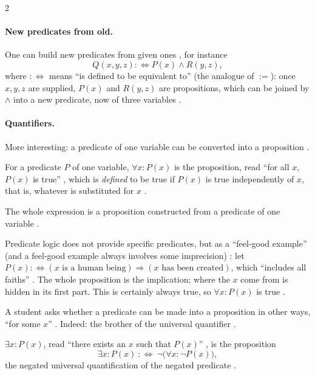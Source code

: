 \begin{paracol}{2}
\paragraph{New predicates from old.} One can build new predicates from given ones , for instance
\[
  Q(x,y,z):\Leftrightarrow P(x)\wedge R(y,z),
\]
where $:\Leftrightarrow$ means ``is defined to be equivalent to'' (the analogue of $:=$): once $x,y,z$ are
supplied, $P(x)$ and $R(y,z)$ are propositions, which can be joined by $\wedge$ into a new predicate, now of three
variables .

\paragraph{Quantifiers.} More interesting: a predicate of one variable can be converted into a proposition
.

\begin{definition}\label{def:lo-forall}
For a predicate $P$ of one variable, $\forall x\colon P(x)$ is the proposition, read ``for all $x$, $P(x)$ is
true'' , which is \emph{defined} to be true if $P(x)$ is true independently of $x$, that is,
whatever is substituted for $x$ .
\end{definition}
The whole expression is a proposition constructed from a predicate of one variable .

\begin{example}
Predicate logic does not provide specific predicates, but as a ``feel-good example'' (and a feel-good example
always involves some imprecision) : let
$P(x):\Leftrightarrow (x\text{ is a human being})\Rightarrow(x\text{ has been created})$, which ``includes all
faiths'' . The whole proposition is the implication; where the $x$ come from is hidden in its
first part. This is certainly always true, so $\forall x\colon P(x)$ is true .
\end{example}

A student asks whether a predicate can be made into a proposition in other ways, ``for some $x$''
. Indeed: the brother of the universal quantifier .

\begin{definition}\label{def:lo-exists}
$\exists x\colon P(x)$, read ``there exists an $x$ such that $P(x)$'' , is the proposition
\[
  \exists x\colon P(x)\ :\Leftrightarrow\ \neg\bigl(\forall x\colon \neg P(x)\bigr),
\]
the negated universal quantification of the negated predicate .
\end{definition}


\end{paracol}

